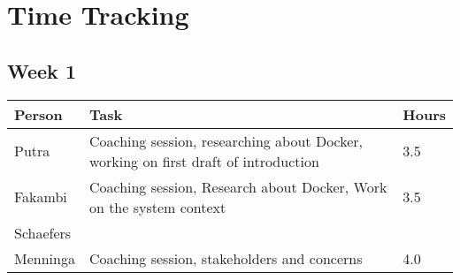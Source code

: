 \chapter{Time Tracking}
\label{App: Time Tracking}

\section*{Week 1}
\begin{longtable}{p{} p{} p{}}
	\textbf{Person} & \textbf{Task} & \textbf{Hours} \\ \toprule
	Putra           & Coaching session, researching about Docker, working on first draft of introduction 	& 3.5	\\ \midrule
	Fakambi         &	Coaching session, Research about Docker, Work on the system context & 3.5	\\ \midrule
	Schaefers       & 	& 	\\ \midrule
	Menninga        & Coaching session, stakeholders and concerns & 4.0 \\ \bottomrule
\end{longtable}